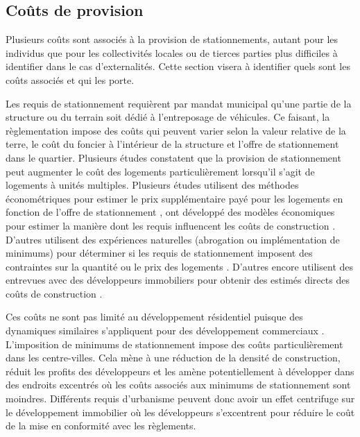     \subsection{Coûts de provision}
    Plusieurs coûts sont associés à la provision de stationnements, autant pour les individus que pour les collectivités locales ou de tierces parties plus difficiles à identifier dans le cas d'externalités. Cette section visera à identifier quels sont les coûts associés et qui les porte.\par
    Les requis de stationnement requièrent par mandat municipal qu'une partie de la structure ou du terrain soit dédié à l'entreposage de véhicules. Ce faisant, la règlementation impose des coûts qui peuvent varier selon la valeur relative de la terre, le coût du foncier à l'intérieur de la structure et l'offre de stationnement dans le quartier. 
    Plusieurs études constatent que la provision de stationnement peut augmenter le coût des logements particulièrement lorsqu'il s'agit de logements à unités multiples. 
    Plusieurs études utilisent des méthodes économétriques pour estimer le prix supplémentaire payé pour les logements en fonction de l'offre de stationnement \cite{jia_parking_1999,gabbe_hidden_2017,shah_impact_2024}, ont développé des modèles économiques pour estimer la manière dont les requis influencent les coûts de construction \parencite{lehe_how_2018,andersson_effect_2016}. D'autres utilisent des expériences naturelles (abrogation ou implémentation de minimums) pour déterminer si les requis de stationnement imposent des contraintes sur la quantité ou le prix des logements \parencite{li_parking_2014,smith_low-rise_1964}. D'autres encore utilisent des entrevues avec des développeurs immobiliers pour obtenir des estimés directs des coûts de construction \parencite{mcdonnell_minimum_2011,cudney_parking_2017}.\par
    Ces coûts ne sont pas limité au développement résidentiel puisque des dynamiques similaires s'appliquent pour des développement commerciaux \parencite{franco_shadow_2020,cutter_parking_2012}. L'imposition de minimums de stationnement impose des coûts particulièrement dans les centre-villes. Cela mène à une réduction de la densité de construction, réduit les profits des développeurs et les amène potentiellement à développer dans des endroits excentrés où les coûts associés aux minimums de stationnement sont moindres. Différents requis d'urbanisme peuvent donc avoir un effet centrifuge sur le développement immobilier où les développeurs s'excentrent pour réduire le coût de la mise en conformité avec les règlements.\par
